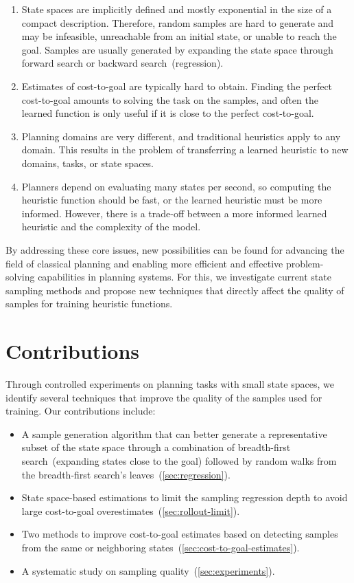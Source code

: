 \begin{enumerate}[label=C\arabic*),left=0pt]
    \itemsep0pt
    \item State spaces are implicitly defined and mostly exponential in the size of a compact description. Therefore, random samples are hard to generate and may be infeasible, unreachable from an initial state, or unable to reach the goal. Samples are usually generated by expanding the state space through forward search or backward search~(regression).
    \item Estimates of cost-to-goal are typically hard to obtain. Finding the perfect cost-to-goal amounts to solving the task on the samples, and often the learned function is only useful if it is close to the perfect cost-to-goal.
    \item Planning domains are very different, and traditional heuristics apply to any domain. This results in the problem of transferring a learned heuristic to new domains, tasks, or state spaces.
    \item Planners depend on evaluating many states per second, so computing the heuristic function should be fast, or the learned heuristic must be more informed. However, there is a trade-off between a more informed learned heuristic and the complexity of the model.
\end{enumerate}

By addressing these core issues, new possibilities can be found for advancing the field of classical planning and enabling more efficient and effective problem-solving capabilities in planning systems. For this, we investigate current state sampling methods and propose new techniques that directly affect the quality of samples for training heuristic functions.

\section{Contributions}
\label{sec:contributions}

Through controlled experiments on planning tasks with small state spaces, we identify several techniques that improve the quality of the samples used for training. Our contributions include:

\begin{itemize}
    \item A sample generation algorithm that can better generate a representative subset of the state space through a combination of breadth-first search~(expanding states close to the goal) followed by random walks from the breadth-first search's leaves~(\cref{sec:regression}).
    \item State space-based estimations to limit the sampling regression depth to avoid large cost-to-goal overestimates~(\cref{sec:rollout-limit}).
    \item Two methods to improve cost-to-goal estimates based on detecting samples from the same or neighboring states~(\cref{sec:cost-to-goal-estimates}).
    \item A systematic study on sampling quality~(\cref{sec:experiments}).
\end{itemize}

